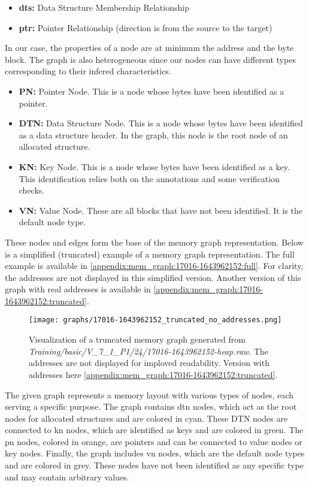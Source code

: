 \begin{itemize}
    \item \textbf{dts:} Data Structure Membership Relationship
    \item \textbf{ptr:} Pointer Relationship (direction is from the source to the target)
\end{itemize}

In our case, the properties of a node are at minimum the address and the byte block.  The graph is also heterogeneous since our nodes can have different types corresponding to their infered characteristics. 

\begin{itemize}
    \item \textbf{PN:} Pointer Node. This is a node whose bytes have been identified as a pointer.
    \item \textbf{DTN:} Data Structure Node. This is a node whose bytes have been identified as a data structure header. In the graph, this node is the root node of an allocated structure.
    \item \textbf{KN:} Key Node. This is a node whose bytes have been identified as a key. This identification relies both on the annotations and some verification checks.
    \item \textbf{VN:} Value Node. These are all blocks that have not been identified. It is the default  node type.
\end{itemize}

These nodes and edges form the base of the memory graph representation. Below is a simplified (truncated) example of a memory graph representation. The full example is available in \ref{appendix:mem_graph:17016-1643962152:full}. For clarity, the addresses are not displayed in this simplified version. Another version of this graph with real addresses is available in \ref{appendix:mem_graph:17016-1643962152:truncated}.

\begin{figure}[H]\label{appendix:mem_graph:17016-1643962152:simplified}
    \centering
    \texttt{[image: graphs/17016-1643962152\_truncated\_no\_addresses.png]}
    \caption{Visualization of a truncated memory graph generated from \textit{Training/basic/V\_7\_1\_P1/24/17016-1643962152-heap.raw}. The addresses are not displayed for imploved readability. Version with addresses here \ref{appendix:mem_graph:17016-1643962152:truncated}.}
\end{figure}

The given graph represents a memory layout with various types of nodes, each serving a specific purpose. The graph contains \gls{dtn} nodes, which act as the root nodes for allocated structures and are colored in cyan. These DTN nodes are connected to \gls{kn} nodes, which are identified as keys and are colored in green. The \gls{pn} nodes, colored in orange, are pointers and can be connected to value nodes or key nodes. Finally, the graph includes \gls{vn} nodes, which are the default node types and are colored in grey. These nodes have not been identified as any specific type and may contain arbitrary values.

